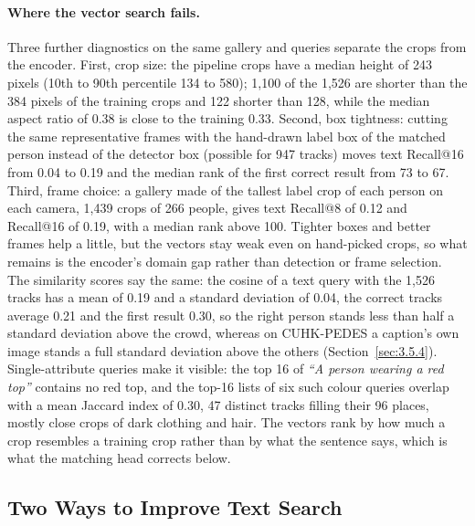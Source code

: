 \paragraph{Where the vector search fails.} Three further diagnostics on the same gallery and queries separate the crops from the encoder. First, crop size: the pipeline crops have a median height of 243 pixels (10th to 90th percentile 134 to 580); 1,100 of the 1,526 are shorter than the 384 pixels of the training crops and 122 shorter than 128, while the median aspect ratio of 0.38 is close to the training 0.33. Second, box tightness: cutting the same representative frames with the hand-drawn label box of the matched person instead of the detector box (possible for 947 tracks) moves text Recall@16 from 0.04 to 0.19 and the median rank of the first correct result from 73 to 67. Third, frame choice: a gallery made of the tallest label crop of each person on each camera, 1,439 crops of 266 people, gives text Recall@8 of 0.12 and Recall@16 of 0.19, with a median rank above 100. Tighter boxes and better frames help a little, but the vectors stay weak even on hand-picked crops, so what remains is the encoder's domain gap rather than detection or frame selection. The similarity scores say the same: the cosine of a text query with the 1,526 tracks has a mean of 0.19 and a standard deviation of 0.04, the correct tracks average 0.21 and the first result 0.30, so the right person stands less than half a standard deviation above the crowd, whereas on CUHK-PEDES a caption's own image stands a full standard deviation above the others (Section~\ref{sec:3.5.4}). Single-attribute queries make it visible: the top 16 of \emph{``A person wearing a red top''} contains no red top, and the top-16 lists of six such colour queries overlap with a mean Jaccard index of 0.30, 47 distinct tracks filling their 96 places, mostly close crops of dark clothing and hair. The vectors rank by how much a crop resembles a training crop rather than by what the sentence says, which is what the matching head corrects below.

\subsection{Two Ways to Improve Text Search}

